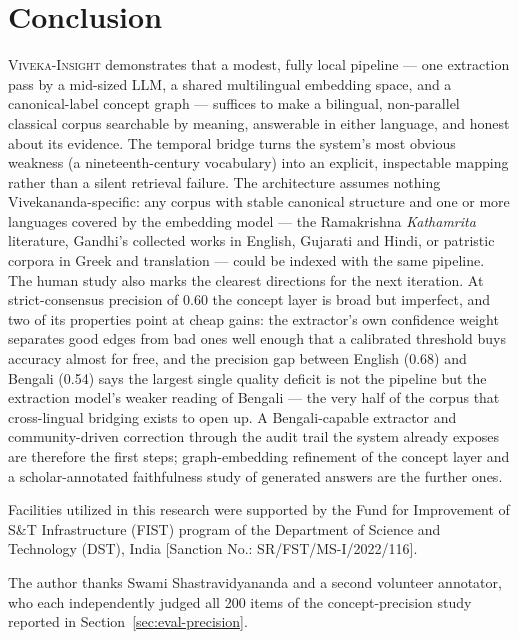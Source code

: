 \documentclass[pdflatex,sn-mathphys-num]{sn-jnl}
\newcommand{\system}{\textsc{Viveka-Insight}}
\begin{document}
\section{Conclusion}

\system{} demonstrates that a modest, fully local pipeline --- one
extraction pass by a mid-sized LLM, a shared multilingual embedding
space, and a canonical-label concept graph --- suffices to make a
bilingual, non-parallel classical corpus searchable by meaning,
answerable in either language, and honest about its evidence. The
temporal bridge turns the system's most obvious weakness (a
nineteenth-century vocabulary) into an explicit, inspectable mapping
rather than a silent retrieval failure. The architecture assumes nothing
Vivekananda-specific: any corpus with stable canonical structure and one
or more languages covered by the embedding model --- the Ramakrishna
\emph{Kathamrita} literature, Gandhi's collected works in English,
Gujarati and Hindi, or patristic corpora in Greek and translation ---
could be indexed with the same pipeline. The human study also marks the
clearest directions for the next iteration. At strict-consensus precision
of 0.60 the concept layer is broad but imperfect, and two of its
properties point at cheap gains: the extractor's own confidence weight
separates good edges from bad ones well enough that a calibrated
threshold buys accuracy almost for free, and the precision gap between
English (0.68) and Bengali (0.54) says the largest single quality deficit
is not the pipeline but the extraction model's weaker reading of Bengali
--- the very half of the corpus that cross-lingual bridging exists to
open up. A Bengali-capable extractor and community-driven correction
through the audit trail the system already exposes are therefore the
first steps; graph-embedding refinement of the concept layer and a
scholar-annotated faithfulness study of generated answers are the
further ones.

\backmatter


Facilities utilized in this research were supported by the Fund for
Improvement of S\&T Infrastructure (FIST) program of the Department of
Science and Technology (DST), India [Sanction No.: SR/FST/MS-I/2022/116].

The author thanks Swami Shastravidyananda and a second volunteer
annotator, who each independently judged all 200 items of the
concept-precision study reported in Section~\ref{sec:eval-precision}.
\end{document}
